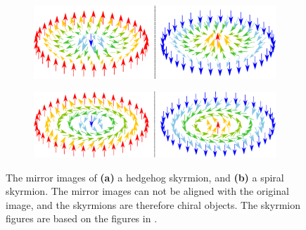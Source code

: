 \begin{figure}[h!]
\centering
\begin{subfigure}{.95\textwidth}
  \centering
  \includegraphics[width=\linewidth]{Figures/MirroredHedgehogSkyrmion.pdf}
  \caption{}
  \label{fig:MirrorHedgehog}
\end{subfigure}

\begin{subfigure}{.95\textwidth}
  \centering
  \includegraphics[width=\linewidth]{Figures/MirroredSpiralSkyrmionv2.pdf}
  \caption{}
  \label{fig:MirrorSpiral}
\end{subfigure}
\caption{The mirror images of \textbf{(a)} a hedgehog skyrmion, and \textbf{(b)} a spiral skyrmion. The mirror images can not be aligned with the original image, and the skyrmions are therefore chiral objects. The skyrmion figures are based on the figures in \cite{EverschorDissertation}.}
\label{fig:ChiralitySkyrmions}
\end{figure}


